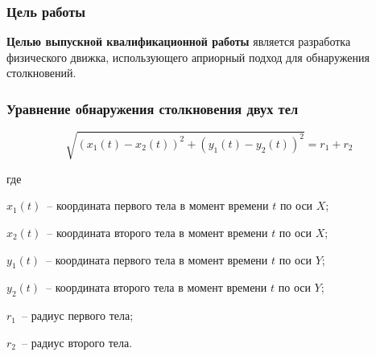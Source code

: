 \documentclass[xetex,aspectratio=43]{beamer}
\newenvironment{Underequation}{
    \small
    \noindent
    где
    \hspace{-1.45ex}
    \setlength{\parindent}{3.5ex}
}{}
\begin{document}
\begin{frame}
    \frametitle{Цель работы}

    \textbf{Целью выпускной квалификационной работы} является
    разработка физического движка, использующего априорный подход для обнаружения столкновений.

\end{frame}

\begin{frame}
    \frametitle{Уравнение обнаружения столкновения двух тел}

    \begin{equation}\label{bodybodyoft}
        \sqrt{(x_1(t) - x_2(t))^2 + (y_1(t) - y_2(t))^2} = r_1 + r_2
    \end{equation}

    \begin{Underequation}
        \(x_1(t)\)~-- координата первого тела в момент времени \(t\) по оси \(X\);

        \(x_2(t)\)~-- координата второго тела в момент времени \(t\) по оси \(X\);

        \(y_1(t)\)~-- координата первого тела в момент времени \(t\) по оси \(Y\);

        \(y_2(t)\)~-- координата второго тела в момент времени \(t\) по оси \(Y\);

        \(r_1\)~-- радиус первого тела;

        \(r_2\)~-- радиус второго тела.
    \end{Underequation}

\end{frame}
\end{document}
